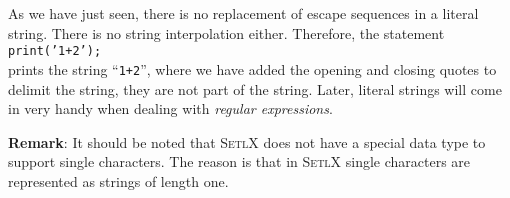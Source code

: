 As we have just seen, there is no replacement of escape sequences in a literal string.
There is no string interpolation either.  Therefore, the statement
\\[0.2cm]
\hspace*{1.3cm}
\texttt{print('1+2');}
\\[0.2cm]
prints the string ``\texttt{1+2}'', where we have added the opening
and closing quotes to delimit the string, they are not part of the string.
Later, literal strings will come in very handy when dealing with \emph{regular expressions}.

\noindent
\textbf{Remark}:
It should be noted that \textsc{SetlX} does not have a special data type to support single characters.
The reason is that in \textsc{SetlX} single characters are represented as strings of length one. 

